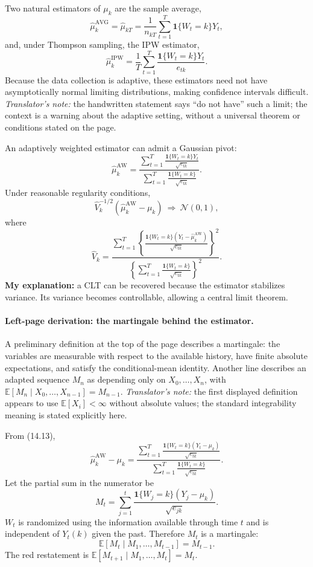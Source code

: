 Two natural estimators of $\mu_k$ are the sample average,
\[
 \widehat\mu_k^{\mathrm{AVG}}=\widehat\mu_{kT}
 =\frac1{n_{kT}}\sum_{t=1}^T\mathbf1\{W_t=k\}Y_t,\tag{14.11}
\]
and, under Thompson sampling, the IPW estimator,
\[
 \widehat\mu_k^{\mathrm{IPW}}=\frac1T\sum_{t=1}^T
 \frac{\mathbf1\{W_t=k\}Y_t}{e_{tk}}.\tag{14.12}
\]
Because the data collection is adaptive, these estimators need not have asymptotically normal limiting distributions, making confidence intervals difficult. \textit{Translator's note:} the handwritten statement says ``do not have'' such a limit; the context is a warning about the adaptive setting, without a universal theorem or conditions stated on the page.

An adaptively weighted estimator can admit a Gaussian pivot:
\[
 \widehat\mu_k^{\mathrm{AW}}
 =\frac{\displaystyle\sum_{t=1}^T
 \frac{\mathbf1\{W_t=k\}Y_t}{\sqrt{e_{tk}}}}
 {\displaystyle\sum_{t=1}^T
 \frac{\mathbf1\{W_t=k\}}{\sqrt{e_{tk}}}}.\tag{14.13}
\]
Under reasonable regularity conditions,
\[
 \widehat V_k^{-1/2}(\widehat\mu_k^{\mathrm{AW}}-\mu_k)
 \ \Rightarrow\ \mathcal N(0,1),
\]
where
\[
 \widehat V_k=
 \frac{\displaystyle\sum_{t=1}^T
 \left\{\frac{\mathbf1\{W_t=k\}(Y_t-\widehat\mu_k^{\mathrm{AW}})}
 {\sqrt{e_{tk}}}\right\}^{\!2}}
 {\displaystyle\left\{\sum_{t=1}^T
 \frac{\mathbf1\{W_t=k\}}{\sqrt{e_{tk}}}\right\}^{\!2}}.\tag{14.14}
\]
\textbf{My explanation:} a CLT can be recovered because the estimator stabilizes variance. Its variance becomes controllable, allowing a central limit theorem.

\paragraph{Left-page derivation: the martingale behind the estimator.}
A preliminary definition at the top of the page describes a martingale: the variables are measurable with respect to the available history, have finite absolute expectations, and satisfy the conditional-mean identity. Another line describes an adapted sequence $M_n$ as depending only on $X_0,\ldots,X_n$, with
$\mathbb E[M_n\mid X_0,\ldots,X_{n-1}]=M_{n-1}$.
\textit{Translator's note:} the first displayed definition appears to use $\mathbb E[X_i]<\infty$ without absolute values; the standard integrability meaning is stated explicitly here.

From (14.13),
\[
 \widehat\mu_k^{\mathrm{AW}}-\mu_k
 =\frac{\displaystyle\sum_{t=1}^T
 \frac{\mathbf1\{W_t=k\}(Y_t-\mu_k)}{\sqrt{e_{tk}}}}
 {\displaystyle\sum_{t=1}^T
 \frac{\mathbf1\{W_t=k\}}{\sqrt{e_{tk}}}}.
\]
Let the partial sum in the numerator be
\[
 M_t=\sum_{j=1}^t
 \frac{\mathbf1\{W_j=k\}(Y_j-\mu_k)}{\sqrt{e_{jk}}}.
\]
$W_t$ is randomized using the information available through time $t$ and is independent of $Y_t(k)$ given the past. Therefore $M_t$ is a martingale:
\[
 \mathbb E[M_t\mid M_1,\ldots,M_{t-1}]=M_{t-1}.
\]
The red restatement is $\mathbb E[M_{t+1}\mid M_1,\ldots,M_t]=M_t$.

